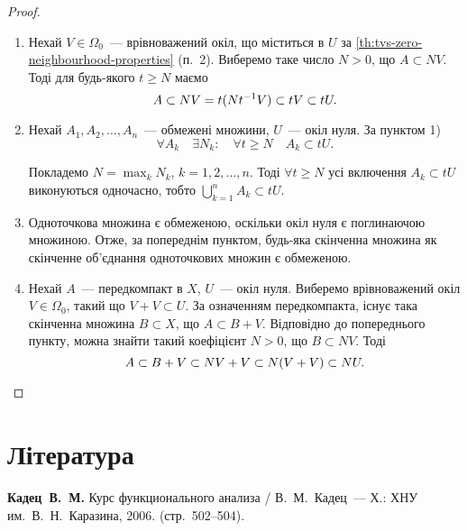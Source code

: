\begin{proof}
    \listhack
    \begin{enumerate}
        \item Нехай $V \in \Omega_0$~--- врівноважений окіл, що міститься в $U$ за \cref{th:tvs-zero-neighbourhood-properties} (п.~2). Виберемо таке число $N > 0$, що $A \subset N V$. Тоді для будь-якого $t \ge N$ маємо
        \begin{equation*}
            A \subset N V = t (N t^{-1} V) \subset t V \subset t U.
        \end{equation*}

        \item Нехай $A_1, A_2, \dots, A_n$~--- обмежені множини, $U$~--- окіл нуля. За пунктом 1)
        \begin{equation*}
            \forall A_k \quad \exists N_k: \quad \forall t \ge N \quad A_k \subset t U.
        \end{equation*}

        Покладемо $N = \max_k N_k$, $k = 1, 2, \dots, n$. Тоді $\forall t \ge N$ усі включення $A_k \subset tU$ виконуються одночасно, тобто $\bigcup_{k = 1}^n A_k \subset t U$.

        \item Одноточкова множина є обмеженою, оскільки окіл нуля є поглинаючою множиною. Отже, за попереднім пунктом, будь-яка скінченна множина як скінченне об'\-єд\-на\-ння одноточкових множин є обмеженою.

        \item Нехай $A$~--- передкомпакт в $X$, $U$~--- окіл нуля. Виберемо врівноважений окіл $V \in \Omega_0$, такий що $V + V \subset U$. За означенням передкомпакта, існує така скінченна множина $B \subset X$, що $A \subset B + V$. Відповідно до попереднього пункту, можна знайти такий коефіцієнт $N > 0$, що $B \subset N V$. Тоді
        \begin{equation*}
            A \subset B + V \subset NV + V \subset N (V + V) \subset N U. \qedhere
        \end{equation*}
    \end{enumerate}
\end{proof}

\section{Література}

\begin{enumerate}[label={[\arabic*]}]
\item \textbf{Кадец~В.~М.}
Курс функционального анализа /
В.~М.~Кадец~---
Х.: ХНУ им.~В.~Н.~Каразина, 2006. (стр.~502--504).
\end{enumerate}
